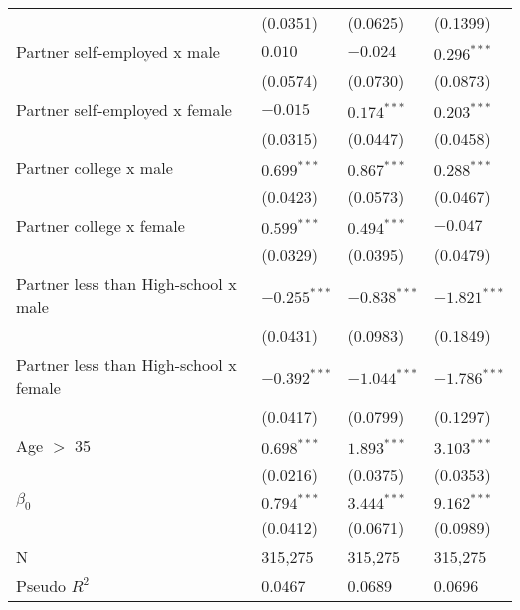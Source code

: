 \begin{tabular}{llll}
                                       &           (0.0351) &           (0.0625) &           (0.1399) \\
Partner self-employed x male           &            $0.010$ &           $-0.024$ &      $0.296^{***}$ \\
                                       &           (0.0574) &           (0.0730) &           (0.0873) \\
Partner self-employed x female         &           $-0.015$ &      $0.174^{***}$ &      $0.203^{***}$ \\
                                       &           (0.0315) &           (0.0447) &           (0.0458) \\
Partner college x male                 &      $0.699^{***}$ &      $0.867^{***}$ &      $0.288^{***}$ \\
                                       &           (0.0423) &           (0.0573) &           (0.0467) \\
Partner college x female               &      $0.599^{***}$ &      $0.494^{***}$ &           $-0.047$ \\
                                       &           (0.0329) &           (0.0395) &           (0.0479) \\
Partner less than High-school x male   &     $-0.255^{***}$ &     $-0.838^{***}$ &     $-1.821^{***}$ \\
                                       &           (0.0431) &           (0.0983) &           (0.1849) \\
Partner less than High-school x female &     $-0.392^{***}$ &     $-1.044^{***}$ &     $-1.786^{***}$ \\
                                       &           (0.0417) &           (0.0799) &           (0.1297) \\
Age $>$ 35                             &      $0.698^{***}$ &      $1.893^{***}$ &      $3.103^{***}$ \\
                                       &           (0.0216) &           (0.0375) &           (0.0353) \\
$\beta_0$                              &      $0.794^{***}$ &      $3.444^{***}$ &      $9.162^{***}$ \\
                                       &           (0.0412) &           (0.0671) &           (0.0989) \\
N                                      &            315,275 &            315,275 &            315,275 \\
Pseudo $R^2$                           &             0.0467 &             0.0689 &             0.0696 \\
\bottomrule
\end{tabular}
